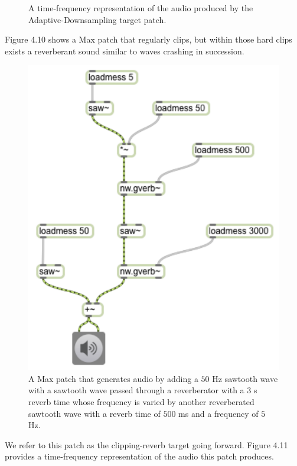\documentclass[12pt]{report} 	%
\numberwithin{figure}{chapter}
\numberwithin{table}{chapter}
\numberwithin{equation}{chapter}
\begin{document}
\begin{flushleft}
\begin{figure}[h!]
\begin{center}
\caption[Adaptive downsampling time-frequency representation]{A time-frequency representation of the audio produced by the Adaptive-Downsampling target patch.}
\end{center}
\end{figure}
Figure 4.10 shows a Max patch that regularly clips, but within those hard clips exists a reverberant sound similar to waves crashing in succession. 
\begin{figure}[h!]
\begin{center}
\includegraphics[scale=0.8]{ClippingReverbSaw}
\caption[Clipping reverb sawtooth Max patch]{A Max patch that generates audio by adding a $50$ Hz sawtooth wave with a sawtooth wave passed through a reverberator with a $3$ s reverb time whose frequency is varied by another reverberated sawtooth wave with a reverb time of $500$ ms and a frequency of $5$ Hz.}
\end{center}
\end{figure}

We refer to this patch as the clipping-reverb target going forward. Figure 4.11 provides a time-frequency representation of the audio this patch produces.


\end{flushleft}
\end{document}
